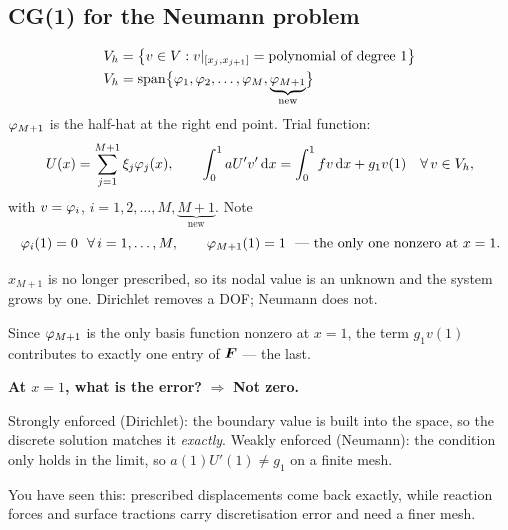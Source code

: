 \subsection*{CG(1) for the Neumann problem}

\begin{align}
  V_{h} &= \bigl\{ v\in V : v|_{[x_{j},x_{j+1}]} = \text{polynomial of degree }1 \bigr\}\\
  V_{h} &= \operatorname{span}\bigl\{\varphi_{1},\varphi_{2},\dots,\varphi_{M},
         \underbrace{\varphi_{M+1}}_{\text{new}}\bigr\}
\end{align}
$\varphi_{M+1}$ is the half-hat at the right end point. Trial function:
\begin{equation}
  U(x)=\sum_{j=1}^{M+1}\xi_{j}\varphi_{j}(x),
  \qquad
  \int_{0}^{1} a U'v'\,\mathrm{d} x = \int_{0}^{1} f v\,\mathrm{d} x + g_{1}v(1)
  \quad\forall\, v\in V_{h},
\end{equation}
with $v=\varphi_{i}$, $i=1,2,\dots,M,\underbrace{M+1}_{\text{new}}$. Note
\begin{equation}
  \varphi_{i}(1)=0 \ \ \forall\, i=1,\dots,M,
  \qquad
  \varphi_{M+1}(1)=1 \ \ \text{--- the only one nonzero at } x=1 .
\end{equation}

\begin{intuition}
$x_{M+1}$ is no longer prescribed, so its nodal value is an unknown and the
system grows by one. Dirichlet removes a DOF; Neumann does not.

Since $\varphi_{M+1}$ is the only basis function nonzero at $x=1$, the term
$g_{1}v(1)$ contributes to exactly one entry of $\bm{F}$ --- the last.
\end{intuition}

\medskip
\noindent
\textbf{At $x=1$, what is the error?} $\Rightarrow$ \textbf{Not zero.}

\begin{pitfall}
Strongly enforced (Dirichlet): the boundary value is built into the space, so
the discrete solution matches it \emph{exactly}. Weakly enforced (Neumann): the
condition only holds in the limit, so $a(1)U'(1)\ne g_{1}$ on a finite mesh.

You have seen this: prescribed displacements come back exactly, while reaction
forces and surface tractions carry discretisation error and need a finer mesh.
\end{pitfall}
